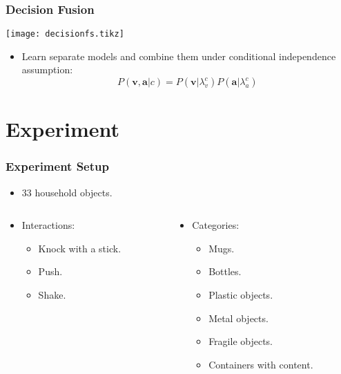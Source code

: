 \documentclass{beamer}
\begin{document}
  \begin{frame}
    \frametitle{Decision Fusion}

    \centering
    \texttt{[image: decisionfs.tikz]}

    \begin{itemize}
      \item Learn separate models and combine them under conditional independence assumption:
        \[ P(\mathbf{v},\mathbf{a}|c) = P(\mathbf{v}|\lambda_v^c) P(\mathbf{a}|\lambda_a^c) \]
    \end{itemize}
  \end{frame}

  \section{Experiment}
  \begin{frame}
    \frametitle{Experiment Setup}

    \begin{itemize}
      \item 33 household objects.
    \end{itemize}

    \begin{columns}
      \begin{column}{.45\textwidth}
        \begin{itemize}
          \item Interactions:
            \begin{itemize}
              \item Knock with a stick.
              \item Push.
              \item Shake.
            \end{itemize}
        \end{itemize}
      \end{column}
      \begin{column}{.45\textwidth}
        \begin{itemize}
          \item Categories:
            \begin{itemize}
              \item Mugs.
              \item Bottles.
              \item Plastic objects.
              \item Metal objects.
              \item Fragile objects.
              \item Containers with content.
            \end{itemize}
        \end{itemize}
      \end{column}
    \end{columns}
  \end{frame}
\end{document}
